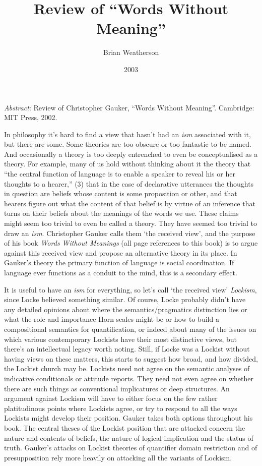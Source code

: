 \documentclass[
  11pt,
  letterpaper,
  DIV=11,
  numbers=noendperiod,
  twoside]{scrartcl}
\title{Review of ``Words Without Meaning''}
\author{Brian Weatherson}
\date{2003}
\renewenvironment{abstract}
 {\vspace{-1.25cm}
 \quotation\small\noindent\emph{Abstract}:}
 {\endquotation}
\begin{document}
\maketitle
\begin{abstract}
Review of Christopher Gauker, ``Words Without Meaning''. Cambridge: MIT
Press, 2002.
\end{abstract}


In philosophy it's hard to find a view that hasn't had an \emph{ism}
associated with it, but there are some. Some theories are too obscure or
too fantastic to be named. And occasionally a theory is too deeply
entrenched to even be conceptualised as a theory. For example, many of
us hold without thinking about it the theory that ``the central function
of language is to enable a speaker to reveal his or her thoughts to a
hearer,'' (3) that in the case of declarative utterances the thoughts in
question are beliefs whose content is some proposition or other, and
that hearers figure out what the content of that belief is by virtue of
an inference that turns on their beliefs about the meanings of the words
we use. These claims might seem too trivial to even be called a theory.
They have seemed too trivial to draw an \emph{ism}. Christopher Gauker
calls them `the received view', and the purpose of his book \emph{Words
Without Meanings} (all page references to this book) is to argue against
this received view and propose an alternative theory in its place. In
Gauker's theory the primary function of language is social coordination.
If language ever functions as a conduit to the mind, this is a secondary
effect.

It is useful to have an \emph{ism} for everything, so let's call `the
received view' \emph{Lockism}, since Locke believed something similar.
Of course, Locke probably didn't have any detailed opinions about where
the semantics/pragmatics distinction lies or what the role and
importance Horn scales might be or how to build a compositional
semantics for quantification, or indeed about many of the issues on
which various contemporary Lockists have their most distinctive views,
but there's an intellectual legacy worth noting. Still, if Locke was a
Lockist without having views on these matters, this starts to suggest
how broad, and how divided, the Lockist church may be. Lockists need not
agree on the semantic analyses of indicative conditionals or attitude
reports. They need not even agree on whether there are such things as
conventional implicatures or deep structures. An argument against
Lockism will have to either focus on the few rather platitudinous points
where Lockists agree, or try to respond to all the ways Lockists might
develop their position. Gauker takes both options throughout his book.
The central theses of the Lockist position that are attacked concern the
nature and contents of beliefs, the nature of logical implication and
the status of truth. Gauker's attacks on Lockist theories of quantifier
domain restriction and of presupposition rely more heavily on attacking
all the variants of Lockism.
\end{document}

